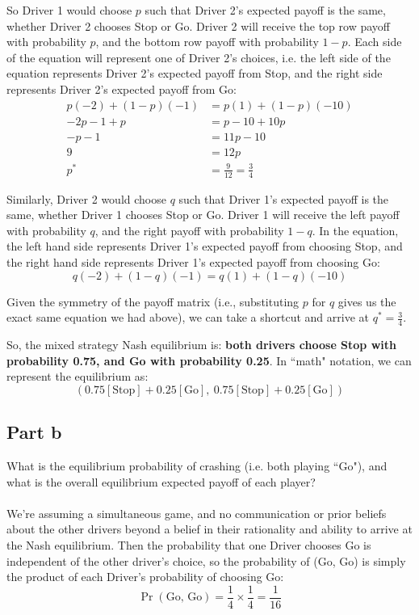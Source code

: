 \documentclass[10pt]{article}
\begin{document}
So Driver 1 would choose $p$ such that Driver 2's expected payoff is the same, whether Driver 2 chooses Stop or Go. Driver 2 will receive the top row payoff with probability $p$, and the bottom row payoff with probability $1-p$. Each side of the equation will represent one of Driver 2's choices, i.e. the left side of the equation represents Driver 2's expected payoff from Stop, and the right side represents Driver 2's expected payoff from Go:
\[
\begin{aligned}
p(-2) + (1-p)(-1) &= p(1) + (1-p)(-10) \\
-2p -1 + p &= p - 10 + 10p \\
-p - 1 &= 11p - 10 \\
9 &= 12p \\
p^* &= \frac{9}{12} = \frac{3}{4}
\end{aligned}
\]

Similarly, Driver 2 would choose $q$ such that Driver 1's expected payoff is the same, whether Driver 1 chooses Stop or Go. Driver 1 will receive the left payoff with probability $q$, and the right payoff with probability $1-q$. In the equation, the left hand side represents Driver 1's expected payoff from choosing Stop, and the right hand side represents Driver 1's expected payoff from choosing Go:
\[
	q(-2) + (1-q)(-1) = q(1) + (1-q)(-10)
\]

Given the symmetry of the payoff matrix (i.e., substituting $p$ for $q$ gives us the exact same equation we had above), we can take a shortcut and arrive at $q^* = \frac{3}{4}$.

So, the mixed  strategy Nash equilibrium is: \textbf{both drivers choose Stop with probability 0.75, and Go with probability 0.25}. In ``math" notation, we can represent the equilibrium as: 
\[
(0.75[\text{Stop}] + 0.25[\text{Go}], \: 0.75[\text{Stop}] + 0.25[\text{Go}])
\]
\newpage

\subsection*{Part b}
What is the equilibrium probability of crashing (i.e. both playing ``Go"), and what is the overall equilibrium expected payoff of each player?
\\ \\
We're assuming a simultaneous game, and no communication or prior beliefs about the other drivers beyond a belief in their rationality and ability to arrive at the Nash equilibrium. Then the probability that one Driver chooses Go is independent of the other driver's choice, so the probability of (Go, Go) is simply the product of each Driver's probability of choosing Go:
\[
\Pr{(\text{Go, Go})} = \frac{1}{4} \times \frac{1}{4} = \frac{1}{16}
\]
\end{document}
